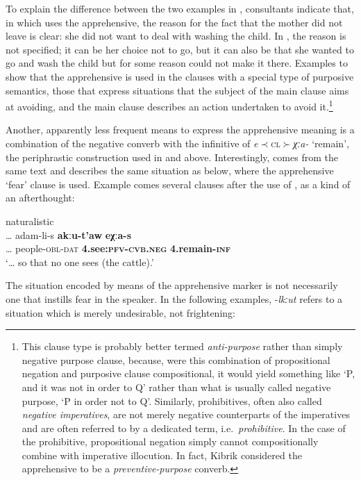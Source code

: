 \documentclass[output=paper,colorlinks,citecolor=brown]{langscibook}
\begin{document}
\noindent To explain the difference between the two examples in , consultants indicate that, in  which uses the apprehensive, the reason for the fact that the mother did not leave is clear: she did not want to deal with washing the child. In , the reason is not specified; it can be her choice not to go, but it can also be that she wanted to go and wash the child but for some reason could not make it there. Examples  to  show that the apprehensive is used in the clauses with a special type of purposive semantics, those that express situations that the subject of the main clause aims at avoiding, and the main clause describes an action undertaken to avoid it.\footnote{This clause type is probably better termed \textit{anti-purpose} rather than simply negative purpose clause, because, were this combination of propositional negation and purposive clause  compositional, it would yield something like `P, and it was not in order to Q' rather than what is usually called negative purpose, `P in order not to Q'. Similarly, prohibitives, often also called \textit{negative imperatives}, are not merely negative counterparts of the imperatives and are often referred to by a dedicated term, i.e.\   \textit{prohibitive}. In the case of the prohibitive, propositional negation simply cannot compositionally combine with imperative illocution. In fact, Kibrik considered the  apprehensive to be a \textit{preventive-purpose} converb.}

Another, apparently less frequent means to express the apprehensive meaning is a combination of the negative converb with the infinitive of \textit{e}${\prec}$\textsc{cl}${\succ}$\textit{χːa-} `remain', the periphrastic construction used in  and  above. Interestingly,  comes from the same text and describes the same situation as  below, where the apprehensive `fear' clause is used. Example  comes several clauses after the use of , as a kind of an afterthought:

\ea \label{ex:DD16} \textnormal{naturalistic} \\
\gll … adam-li-s \textbf{akːu-t'aw} \textbf{eχːa-s} \\
… people-\textsc{obl-dat} \textbf{4.see:\textsc{pfv-cvb.neg}} \textbf{4.remain-\textsc{inf}} \\
\glt `… so that no one sees (the cattle).'
\z


 The situation encoded by means of the apprehensive marker is not necessarily one that instills fear in the speaker. In the following examples, \nobreakdash-\textit{lkːut} refers to a situation which is merely undesirable, not frightening:
 
\end{document}
